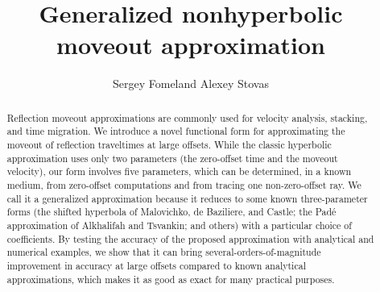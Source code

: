 \title{Generalized nonhyperbolic moveout approximation}

\renewcommand{\thefootnote}{\fnsymbol{footnote}}


\author{Sergey Fomel\footnotemark[1] and Alexey Stovas\footnotemark[2]}

\address{
\footnotemark[1]Bureau of Economic Geology, \\
John A. and Katherine G. Jackson School of Geosciences \\
The University of Texas at Austin \\
University Station, Box X \\
Austin, TX 78713-8972 \\
USA \\
sergey.fomel@beg.utexas.edu \\
\footnotemark[2]Department of Petroleum Engineering and
Applied Geophysics \\
Norwegian University of Science and Technology (NTNU) \\
S.P. Andersenvei 15A \\
7491 Trondheim \\
Norway \\
alexey.stovas@ntnu.no
}

\maketitle

\begin{abstract}
  Reflection moveout approximations are commonly used for velocity
  analysis, stacking, and time migration.  We introduce a novel
  functional form for approximating the moveout of reflection
  traveltimes at large offsets. While the classic hyperbolic
  approximation uses only two parameters (the zero-offset time and the
  moveout velocity), our form involves five parameters, which can be
  determined, in a known medium, from zero-offset computations and
  from tracing one non-zero-offset ray. We call it a generalized
  approximation because it reduces to some known three-parameter forms
  (the shifted hyperbola of Malovichko, de Baziliere, and Castle; the
  Pad\'{e} approximation of Alkhalifah and Tsvankin; and others) with
  a particular choice of coefficients. By testing the accuracy of the
  proposed approximation with analytical and numerical examples, we
  show that it can bring several-orders-of-magnitude improvement in
  accuracy at large offsets compared to known analytical
  approximations, which makes it as good as exact for many practical
  purposes.
\end{abstract}

